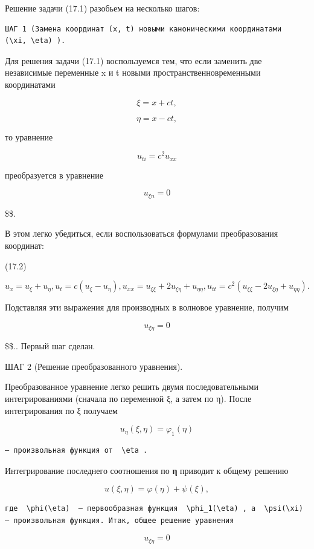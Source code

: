 \documentclass[
  ukrainian,
]{article}
\begin{document}
Решение задачи (17.1) разобьем на несколько шагов:

\begin{verbatim}
ШАГ 1 (Замена координат (x, t) новыми каноническими координатами  (\xi, \eta) ).
\end{verbatim}

Для решения задачи (17.1) воспользуемся тем, что если заменить две
независимые переменные x и t новыми пространственновременными
координатами

\[
\xi = x + ct,
\]

\[
\eta = x - ct,
\]

то уравнение

\[
u_{ti} = c^2 u_{xx}
\]

преобразуется в уравнение

\[
u_{\xi n} = 0
\]

\$\$.

В этом легко убедиться, если воспользоваться формулами преобразования
координат:

(17.2)

\[
u_{x} = u_{\xi} + u_{\eta}, u_{t} = c (u_{\xi} - u_{\eta}), u_{xx} = u_{\xi\xi} + 2u_{\xi\eta} + u_{\eta\eta}, u_{tt} = c^{2} (u_{\xi\xi} - 2u_{\xi\eta} + u_{\eta\eta}).
\]

Подставляя эти выражения для производных в волновое уравнение, получим

\[
u_{\xi\eta} = 0
\]

\$\$.. Первый шаг сделан.

ШАГ 2 (Решение преобразованного уравнения).

Преобразованное уравнение легко решить двумя последовательными
интегрированиями (сначала по переменной ξ, а затем по η). После
интегрирования по ξ получаем

\[
u_{\eta}(\xi, \eta) = \varphi_{1}(\eta)
\]

\begin{verbatim}
— произвольная функция от  \eta .
\end{verbatim}

Интегрирование последнего соотношения по \textbf{η} приводит к общему
решению

\[
u(\xi, \eta) = \varphi(\eta) + \psi(\xi),
\]

\begin{verbatim}
где  \phi(\eta)  — первообразная функция  \phi_1(\eta) , а  \psi(\xi)  — произвольная функция. Итак, общее решение уравнения
\end{verbatim}

\[
u_{\xi\eta} = 0
\]
\end{document}
